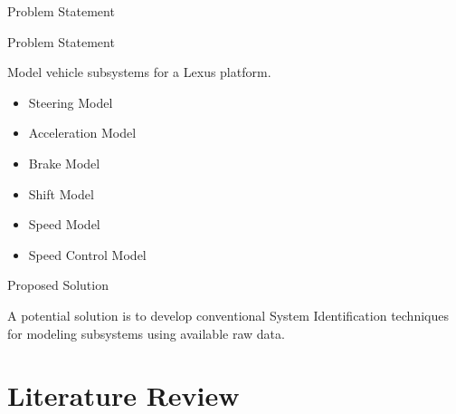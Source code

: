\documentclass{beamer}
\begin{document}
\begin{frame}{Problem Statement}
  \begin{block}{Problem Statement}
    \begin{large}
      Model vehicle subsystems for a Lexus platform.
 \begin{itemize}
          \item Steering Model
          \item Acceleration Model
          \item Brake Model
          \item Shift Model
          \item Speed Model
          \item Speed Control Model
        \end{itemize} 
    \end{large}
  \end{block}
  \pause
  \begin{block}{Proposed Solution}
    \begin{large}
      A potential solution is to develop conventional System Identification techniques for modeling subsystems using available raw data.  
    \end{large}
  \end{block}
\end{frame}


\section{Literature Review}
\end{document}
